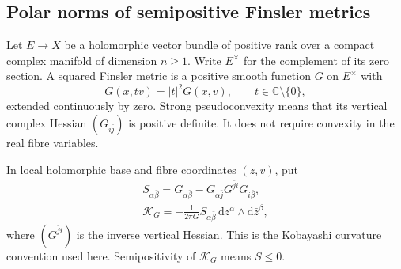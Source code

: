 \subsection{Polar norms of semipositive Finsler metrics}
\label{subsec:polar-finsler-convexity}

Let $E\to X$ be a holomorphic vector bundle of positive rank over a compact complex manifold of dimension $n\geq1$. Write $E^\times$ for the complement of its zero section. A squared Finsler metric is a positive smooth function $G$ on $E^\times$ with
\[
 G(x,tv)=|t|^2G(x,v),\qquad t\in\mathbb C\setminus\{0\},
\]
extended continuously by zero. Strong pseudoconvexity means that its vertical complex Hessian $(G_{i\bar j})$ is positive definite. It does not require convexity in the real fibre variables.

In local holomorphic base and fibre coordinates $(z,v)$, put
\[
 \begin{gathered}
 S_{\alpha\bar\beta}
 =G_{\alpha\bar\beta}
  -G_{\alpha\bar j}G^{\bar j i}G_{i\bar\beta},\\
 \mathcal K_G=-\frac{\mathrm i}{2\pi G}
 S_{\alpha\bar\beta}\,\mathrm dz^\alpha\wedge\mathrm d\bar z^\beta,
 \end{gathered}
\]
where $(G^{\bar j i})$ is the inverse vertical Hessian. This is the Kobayashi curvature convention used here. Semipositivity of $\mathcal K_G$ means $S\leq0$.

